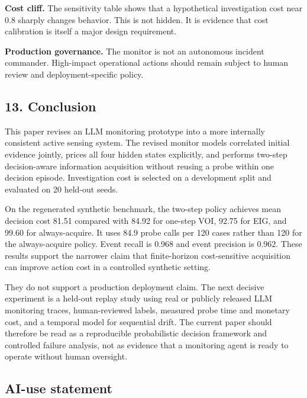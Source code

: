 \documentclass[
]{article}
\begin{document}
\textbf{Cost cliff.} The sensitivity table shows that a hypothetical investigation cost near 0.8 sharply changes behavior. This is not hidden. It is evidence that cost calibration is itself a major design requirement.

\textbf{Production governance.} The monitor is not an autonomous incident commander. High-impact operational actions should remain subject to human review and deployment-specific policy.

\subsection{13. Conclusion}\label{13-conclusion}

This paper revises an LLM monitoring prototype into a more internally consistent active sensing system. The revised monitor models correlated initial evidence jointly, prices all four hidden states explicitly, and performs two-step decision-aware information acquisition without reusing a probe within one decision episode. Investigation cost is selected on a development split and evaluated on 20 held-out seeds.

On the regenerated synthetic benchmark, the two-step policy achieves mean decision cost 81.51 compared with 84.92 for one-step VOI, 92.75 for EIG, and 99.60 for always-acquire. It uses 84.9 probe calls per 120 cases rather than 120 for the always-acquire policy. Event recall is 0.968 and event precision is 0.962. These results support the narrower claim that finite-horizon cost-sensitive acquisition can improve action cost in a controlled synthetic setting.

They do not support a production deployment claim. The next decisive experiment is a held-out replay study using real or publicly released LLM monitoring traces, human-reviewed labels, measured probe time and monetary cost, and a temporal model for sequential drift. The current paper should therefore be read as a reproducible probabilistic decision framework and controlled failure analysis, not as evidence that a monitoring agent is ready to operate without human oversight.

\subsection{AI-use statement}\label{ai-use-statement}
\end{document}
